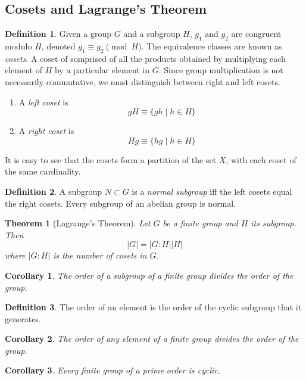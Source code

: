 \documentclass{article}
\newtheorem{theorem}{Theorem}[section]
\newtheorem{corollary}{Corollary}[theorem]
\theoremstyle{remark}
\theoremstyle{definition}
\newtheorem{definition}{Definition}[section]
\begin{document}
\subsection{Cosets and Lagrange's Theorem}

\begin{definition}
Given a group $G$ and a subgroup $H$, $g_1$ and $g_2$ are congruent modulo $H$, denoted $g_1 \equiv g_2 \pmod{H}$. The equivalence classes are known as \textit{cosets}. A coset of somprised of all the products obtained by multiplying each element of $H$ by a particular element in $G$. Since group multiplication is not necessarily commutative, we must distinguish between right and left cosets. 
\begin{enumerate}
    \item A \textit{left coset} is 
    \[ g H \equiv \{g h \;| \;h \in H \} \]
    \item A \textit{right coset} is 
    \[H g \equiv \{h g \;|\; h \in H \} \]
\end{enumerate}
It is easy to see that the cosets form a partition of the set $X$, with each coset of the same cardinality. 
\end{definition}

\begin{definition}
A subgroup $N \subset G$ is a \textit{normal subgroup} iff the left cosets equal the right cosets. Every subgroup of an abelian group is normal. 
\end{definition}

\begin{theorem}[Lagrange's Theorem]
Let $G$ be a finite group and $H$ its subgroup. Then 
\[ |G| = |G:H| |H|\]
where $|G:H|$ is the number of cosets in $G$. 
\end{theorem}

\begin{corollary}
The order of a subgroup of a finite group divides the order of the group. 
\end{corollary}

\begin{definition}
The order of an element is the order of the cyclic subgroup that it generates. 
\end{definition}

\begin{corollary}
The order of any element of a finite group divides the order of the group. 
\end{corollary}

\begin{corollary}
Every finite group of a prime order is cyclic. 
\end{corollary}
\end{document}
